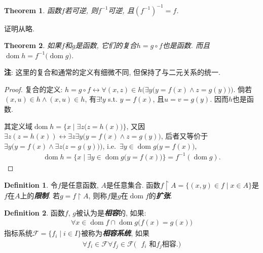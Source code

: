 \documentclass[openany]{ctexbook}
\newcommand*{\indexbf}[1]{\emph{\textbf{#1}}\index{#1}} %
\theoremstyle{plain}
\newtheorem{theorem}{Theorem}[section] %
\theoremstyle{definition}
\newtheorem{definition}{Definition}[section] %
\DeclareMathOperator{\dom}{dom}
\begin{document}
\begin{theorem}
函数$f$若可逆, 则$f^{-1}$可逆, 且$(f^{-1})^{-1} = f$.
\end{theorem}
证明从略.


\begin{theorem}\label{composition_functions}
如果$f$和$g$是函数, 它们的复合$h=g\circ f$也是函数. 
而且$
\dom h=  f^{-1}\big(
	\dom g\big)$.
\end{theorem}
\textbf{注}: 这里的复合和通常的定义有细微不同, 但保持了与二元关系的统一. 
\begin{proof}
复合的定义: $
h=g\circ f \leftrightarrow 
	\forall (x,z)\in h\Big(
		\exists y\big(
			y=f(x)\wedge z=g(y)\big)\Big)$.
倘若$(x,u)\in h\wedge (x,u)\in h$, 有$\exists! y$ s.t. $y=f(x)$, 且$u=v=g(y)$. 因而$h$也是函数. 

其定义域$
\dom h = \{
	x\mid \exists z\big(
		z=h(x)\big)\}$, 
又因$
\exists z(z=h(x)) \leftrightarrow \exists z\exists y\big(
	y=f(x)\wedge z=g(y)\big)$, 后者又等价于$
\exists y\Big(
	y=f(x)\wedge \exists z\big(
		z=g(y)\big)\Big)$, i.e.\ $
\exists y\in \dom g \big(
	y=f(x)\big)$, 
\begin{align*}
	\dom h 
		= \{x\mid \exists y\in \dom g \big(
			y=f(x)\big)\}
		= f^{-1}(\dom g).
\end{align*}
\end{proof}


\begin{definition}
令$f$是任意函数, $A$是任意集合. 函数$f\upharpoonright A = \{ (x,y) \in f\mid x\in A\}$是$f$在$A$上的\indexbf{限制}. 若$g=f\upharpoonright A$, 则称$f$是$g$在$\dom f$的\indexbf{扩张}.
\end{definition}

\begin{definition}
函数$f$, $g$被认为是\indexbf{相容}的, 如果:
\begin{align*}
	\forall x\in \dom f\cap \dom g\big(
		f(x)=g(x)\big)
\end{align*}
指标系统$\mathcal F = \{f_i\mid i\in I\}$被称为\indexbf{相容系统}, 如果
\begin{align*}
\forall f_i\in \mathcal F\forall f_j\in \mathcal F\big(
	\text{ $f_i$ 和$f_j$相容.} \big)
\end{align*}
\end{definition}
\end{document}
